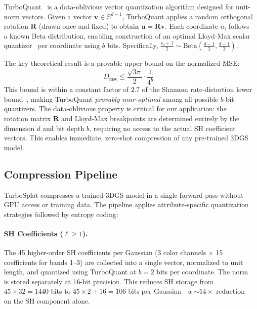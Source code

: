 \documentclass[sigconf,review]{acmart}
\newcommand{\ours}{TurboSplat}
\begin{document}
TurboQuant~\cite{zandieh2025turboquant} is a data-oblivious vector quantization algorithm designed for unit-norm vectors.
Given a vector $\mathbf{v} \in \mathbb{S}^{d-1}$, TurboQuant applies a random orthogonal rotation $\mathbf{R}$ (drawn once and fixed) to obtain $\mathbf{u} = \mathbf{R}\mathbf{v}$.
Each coordinate $u_i$ follows a known Beta distribution, enabling construction of an optimal Lloyd-Max scalar quantizer~\cite{lloyd1982least} per coordinate using $b$ bits.
Specifically, $\frac{u_i+1}{2} \sim \text{Beta}(\frac{d-1}{2}, \frac{d-1}{2})$.

The key theoretical result is a provable upper bound on the normalized MSE:
\begin{equation}
  D_{\text{mse}} \leq \frac{\sqrt{3\pi}}{2} \cdot \frac{1}{4^b}
  \label{eq:mse_bound}
\end{equation}
This bound is within a constant factor of $2.7$ of the Shannon rate-distortion lower bound~\cite{shannon1948, gersho1979asymptotically}, making TurboQuant \emph{provably near-optimal} among all possible $b$-bit quantizers.
The data-oblivious property is critical for our application: the rotation matrix $\mathbf{R}$ and Lloyd-Max breakpoints are determined entirely by the dimension $d$ and bit depth $b$, requiring no access to the actual SH coefficient vectors.
This enables immediate, zero-shot compression of any pre-trained 3DGS model.

\subsection{Compression Pipeline}
\label{sec:pipeline}

\ours{} compresses a trained 3DGS model in a single forward pass without GPU access or training data.
The pipeline applies attribute-specific quantization strategies followed by entropy coding:

\paragraph{SH Coefficients ($\ell \geq 1$).}
The 45 higher-order SH coefficients per Gaussian (3 color channels $\times$ 15 coefficients for bands 1--3) are collected into a single vector, normalized to unit length, and quantized using TurboQuant at $b{=}2$ bits per coordinate.
The norm is stored separately at 16-bit precision.
This reduces SH storage from $45 \times 32 = 1440$ bits to $45 \times 2 + 16 = 106$ bits per Gaussian---a ${\sim}14{\times}$ reduction on the SH component alone.
\end{document}
